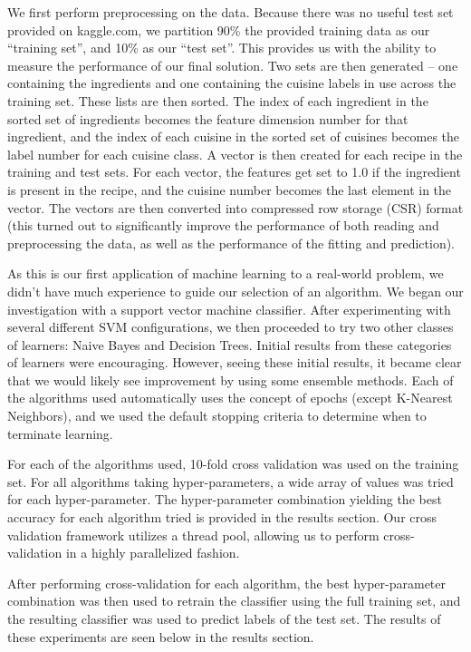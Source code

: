 \documentclass[11pt]{article}
\begin{document}
We first perform preprocessing on the data.  Because there was no
useful test set provided on kaggle.com, we partition 90\% the
provided training data as our ``training set'', and 10\% as our ``test
set''. This provides us with the ability to measure the performance of
our final solution.  Two sets are then generated -- one containing the
ingredients and one containing the cuisine labels in use across the
training set.  These lists are then sorted.  The index of each
ingredient in the sorted set of ingredients becomes the feature 
dimension number for that ingredient, and the index of each cuisine in
the sorted set of cuisines becomes the label number for each cuisine
class.  A vector is then created for each recipe in the training and
test sets.  For each vector, the features get set to 1.0 if the
ingredient is present in the recipe, and the cuisine number becomes
the last element in the vector.  The vectors are then converted into
compressed row storage (CSR) format (this turned out to significantly
improve the performance of both reading and preprocessing the data, as 
well as the performance of the fitting and prediction).

As this is our first application of machine learning to a real-world
problem, we didn't have much experience to guide our selection of an
algorithm.  We began our investigation with a support vector machine
classifier.  After experimenting with several different SVM
configurations, we then proceeded to try two other classes of
learners: Naive Bayes and Decision Trees.  Initial results from these
categories of learners were encouraging.  However, seeing these
initial results, it became clear that we would likely see improvement
by using some ensemble methods.  Each of the algorithms used
automatically uses the concept of epochs (except K-Nearest Neighbors),
and we used the default stopping criteria to determine when to
terminate learning.  

For each of the algorithms used, 10-fold cross validation was used on
the training set.  For all algorithms taking hyper-parameters, a wide
array of values was tried for each hyper-parameter.  The
hyper-parameter combination yielding the best accuracy for each
algorithm tried is provided in the results section.  Our cross
validation framework utilizes a thread pool, allowing us to perform
cross-validation in a highly parallelized fashion.

After performing cross-validation for each algorithm, the best
hyper-parameter combination was then used to retrain the classifier
using the full training set, and the resulting classifier was used
to predict labels of the test set.  The results of these experiments
are seen below in the results section.
\end{document}
